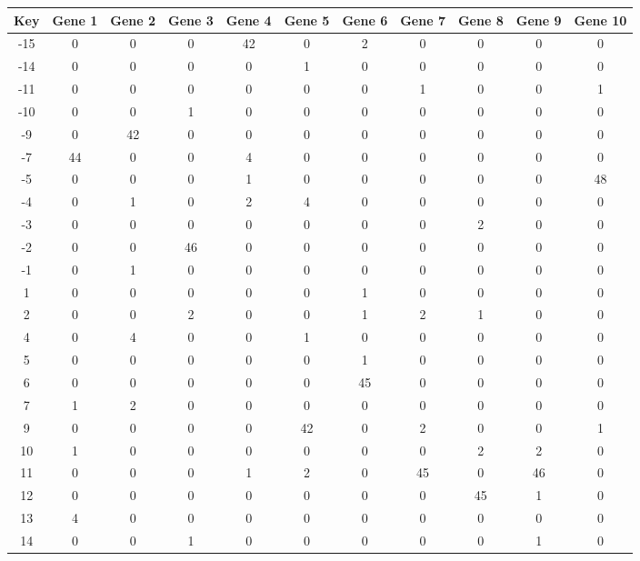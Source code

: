 \begin{tabular}{|c|c|c|c|c|c|c|c|c|c|c|}
\hline
Key & Gene 1 & Gene 2 & Gene 3 & Gene 4 & Gene 5 & Gene 6 & Gene 7 & Gene 8 & Gene 9 & Gene 10 \\
\hline
-15 & 0 & 0 & 0 & 42 & 0 & 2 & 0 & 0 & 0 & 0 \\
-14 & 0 & 0 & 0 & 0 & 1 & 0 & 0 & 0 & 0 & 0 \\
-11 & 0 & 0 & 0 & 0 & 0 & 0 & 1 & 0 & 0 & 1 \\
-10 & 0 & 0 & 1 & 0 & 0 & 0 & 0 & 0 & 0 & 0 \\
-9 & 0 & 42 & 0 & 0 & 0 & 0 & 0 & 0 & 0 & 0 \\
-7 & 44 & 0 & 0 & 4 & 0 & 0 & 0 & 0 & 0 & 0 \\
-5 & 0 & 0 & 0 & 1 & 0 & 0 & 0 & 0 & 0 & 48 \\
-4 & 0 & 1 & 0 & 2 & 4 & 0 & 0 & 0 & 0 & 0 \\
-3 & 0 & 0 & 0 & 0 & 0 & 0 & 0 & 2 & 0 & 0 \\
-2 & 0 & 0 & 46 & 0 & 0 & 0 & 0 & 0 & 0 & 0 \\
-1 & 0 & 1 & 0 & 0 & 0 & 0 & 0 & 0 & 0 & 0 \\
1 & 0 & 0 & 0 & 0 & 0 & 1 & 0 & 0 & 0 & 0 \\
2 & 0 & 0 & 2 & 0 & 0 & 1 & 2 & 1 & 0 & 0 \\
4 & 0 & 4 & 0 & 0 & 1 & 0 & 0 & 0 & 0 & 0 \\
5 & 0 & 0 & 0 & 0 & 0 & 1 & 0 & 0 & 0 & 0 \\
6 & 0 & 0 & 0 & 0 & 0 & 45 & 0 & 0 & 0 & 0 \\
7 & 1 & 2 & 0 & 0 & 0 & 0 & 0 & 0 & 0 & 0 \\
9 & 0 & 0 & 0 & 0 & 42 & 0 & 2 & 0 & 0 & 1 \\
10 & 1 & 0 & 0 & 0 & 0 & 0 & 0 & 2 & 2 & 0 \\
11 & 0 & 0 & 0 & 1 & 2 & 0 & 45 & 0 & 46 & 0 \\
12 & 0 & 0 & 0 & 0 & 0 & 0 & 0 & 45 & 1 & 0 \\
13 & 4 & 0 & 0 & 0 & 0 & 0 & 0 & 0 & 0 & 0 \\
14 & 0 & 0 & 1 & 0 & 0 & 0 & 0 & 0 & 1 & 0 \\
\hline
\end{tabular}